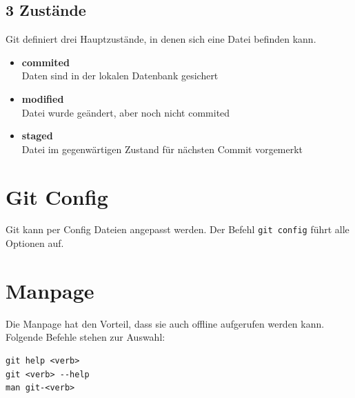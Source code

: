 \subsection{3 Zustände}
Git definiert drei Hauptzustände, in denen sich eine Datei befinden kann. 
\begin{itemize}
\item \textbf{commited}\\
Daten sind in der lokalen Datenbank gesichert
\item \textbf{modified}\\
Datei wurde geändert, aber noch nicht commited
\item \textbf{staged}\\
Datei im gegenwärtigen Zustand für nächsten Commit vorgemerkt
\end{itemize}
\section{Git Config}
Git kann per Config Dateien angepasst werden. Der Befehl \texttt{git config} führt alle Optionen auf.
\section{Manpage}
Die Manpage hat den Vorteil, dass sie auch offline aufgerufen werden kann. Folgende Befehle stehen zur Auswahl:
\begin{lstlisting}[caption={Git Manpage},captionpos=b]
git help <verb>
git <verb> --help
man git-<verb>
\end{lstlisting}
